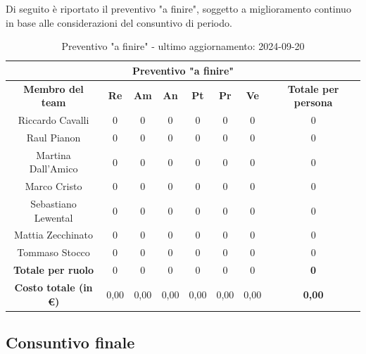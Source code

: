 \begin{minipage}{\textwidth}
Di seguito è riportato il preventivo "a finire", soggetto a miglioramento continuo in base alle considerazioni del consuntivo di periodo.
\begin{table}[H]
  \centering
  \begin{adjustbox}{max width=\textwidth}
  \begin{tabular}{|c|c|c|c|c|c|c|c|}
    \hline
    \multicolumn{8}{|c|}{\textbf{Preventivo "a finire"}} \\
    \hline
    \textbf{Membro del team} & \textbf{Re} & \textbf{Am} & \textbf{An} & \textbf{Pt} & \textbf{Pr} & \textbf{Ve} & \textbf{Totale per persona} \\
    \hline
    Riccardo Cavalli & 0 & 0 & 0 & 0 & 0 & 0 & 0 \\
    \hline
    Raul Pianon & 0 & 0 & 0 & 0 & 0 & 0 & 0 \\
    \hline
    Martina Dall'Amico & 0 & 0 & 0 & 0 & 0 & 0 & 0 \\
    \hline
    Marco Cristo & 0 & 0 & 0 & 0 & 0 & 0 & 0 \\
    \hline
    Sebastiano Lewental & 0 & 0 & 0 & 0 & 0 & 0 & 0 \\
    \hline
    Mattia Zecchinato & 0 & 0 & 0 & 0 & 0 & 0 & 0 \\
    \hline
    Tommaso Stocco & 0 & 0 & 0 & 0 & 0 & 0 & 0 \\
    \hline
    \textbf{Totale per ruolo} & 0 & 0 & 0 & 0 & 0 & 0 & \textbf{0} \\
    \hline
    \textbf{Costo totale (in €)} & 0,00 & 0,00 & 0,00 & 0,00 & 0,00 & 0,00 & \textbf{0,00} \\
    \hline
  \end{tabular}
  \end{adjustbox}
  \caption{Preventivo "a finire" - ultimo aggiornamento: 2024-09-20}\label{tab:preventivo-a-finire}
\end{table}
\end{minipage}


\subsection{Consuntivo finale}\label{sec:consuntivo-finale}

